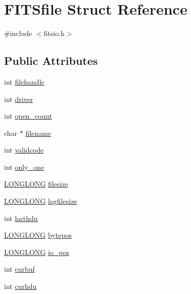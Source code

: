 \hypertarget{struct_f_i_t_sfile}{}\section{F\+I\+T\+Sfile Struct Reference}
\label{struct_f_i_t_sfile}


{\ttfamily \#include $<$fitsio.\+h$>$}

\subsection*{Public Attributes}
\begin{DoxyCompactItemize}
\item 
int \hyperlink{struct_f_i_t_sfile_a61a537e887caa536886167c491436046}{filehandle}
\item 
int \hyperlink{struct_f_i_t_sfile_ace586a820048811afa9dffcbaeaa4a97}{driver}
\item 
int \hyperlink{struct_f_i_t_sfile_acfec155b60756bfa731af39da6f37bf1}{open\+\_\+count}
\item 
char $\ast$ \hyperlink{struct_f_i_t_sfile_aeb009f8c60f7051e434c64cb517aafa7}{filename}
\item 
int \hyperlink{struct_f_i_t_sfile_a715d05243e90a6a6ba8b3cca665e3fab}{validcode}
\item 
int \hyperlink{struct_f_i_t_sfile_a886e4dcfc31e6066104af2f620e8e98a}{only\+\_\+one}
\item 
\hyperlink{cfortran_8h_af559a7ae68520d96f21d0655d6792508}{L\+O\+N\+G\+L\+O\+NG} \hyperlink{struct_f_i_t_sfile_aba9398e53ade3acc8cf9a7d8ea2c8492}{filesize}
\item 
\hyperlink{cfortran_8h_af559a7ae68520d96f21d0655d6792508}{L\+O\+N\+G\+L\+O\+NG} \hyperlink{struct_f_i_t_sfile_a582c31ff430ce8b1e9f0fcccc4ff3a2c}{logfilesize}
\item 
int \hyperlink{struct_f_i_t_sfile_a05ad9c4e3af92a83f2e48560fbeb8d9a}{lasthdu}
\item 
\hyperlink{cfortran_8h_af559a7ae68520d96f21d0655d6792508}{L\+O\+N\+G\+L\+O\+NG} \hyperlink{struct_f_i_t_sfile_a31328a04ea1d6cd9c44014c34b4c6fed}{bytepos}
\item 
\hyperlink{cfortran_8h_af559a7ae68520d96f21d0655d6792508}{L\+O\+N\+G\+L\+O\+NG} \hyperlink{struct_f_i_t_sfile_a251762e5332138e355714c540b88c802}{io\+\_\+pos}
\item 
int \hyperlink{struct_f_i_t_sfile_a401ea589cbbe0d7afa7434cd42f5ede5}{curbuf}
\item 
int \hyperlink{struct_f_i_t_sfile_a57647103a615ea1e0ebdaa90fe2bcc05}{curhdu}

\end{DoxyCompactItemize}
